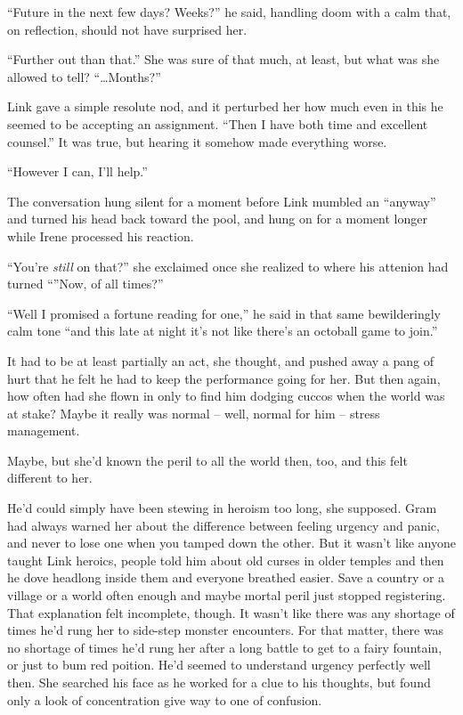 \documentclass[../FGP.tex]{subfiles}
\begin{document}
``Future in the next few days? Weeks?'' he said, handling doom with a calm that, on reflection, should not have surprised her.

``Further out than that.'' She was sure of that much, at least, but what was she allowed to tell? ``\ldots Months?''

Link gave a simple resolute nod, and it perturbed her how much even in this he seemed to be accepting an assignment. 
``Then I have both time and excellent counsel.'' 
It was true, but hearing it somehow made everything worse. 

``However I can, I'll help.''

The conversation hung silent for a moment before Link mumbled an ``anyway'' and turned his head back toward the pool, and hung on for a moment longer while Irene processed his reaction. 

``You're \emph{still} on that?'' she exclaimed once she realized to where his attenion had turned ``''Now, of all times?'' 

``Well I promised a fortune reading for one,'' he said in that same bewilderingly calm tone ``and this late at night it's not like there's an octoball game to join.''

It had to be at least partially an act, she thought, and pushed away a pang of hurt that he felt he had to keep the performance going for her. But then again, how often had she flown in only to find him dodging cuccos when the world was at stake? Maybe it really was normal -- well, normal for him -- stress management.

Maybe, but she'd known the peril to all the world then, too, and this felt different to her.

He'd could simply have been stewing in heroism too long, she supposed. Gram had always warned her about the difference between feeling urgency and panic, and never to lose one when you tamped down the other. But it wasn't like anyone taught Link heroics, people told him about old curses in older temples and then he dove headlong inside them and everyone breathed easier. Save a country or a village or a world often enough and maybe mortal peril just stopped registering. That explanation felt incomplete, though. It wasn't like there was any shortage of times he'd rung her to side-step monster encounters. For that matter, there was no shortage of times he'd rung her after a long battle to get to a fairy fountain, or just to bum red poition. He'd seemed to understand urgency perfectly well then. She searched his face as he worked for a clue to his thoughts, but found only a look of concentration give way to one of confusion.
\end{document}
